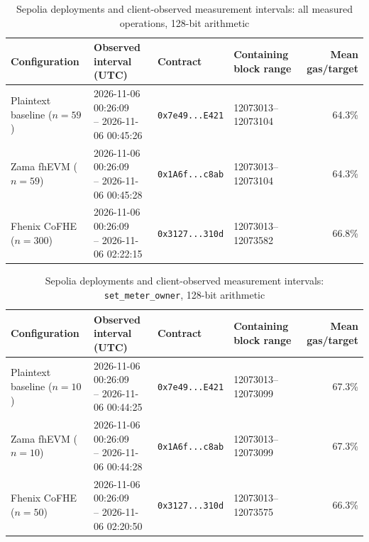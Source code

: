 \begin{table}[!t]
\caption{Sepolia deployments and client-observed measurement intervals: all measured operations, 128-bit arithmetic}
\label{tab:sepolia-client-intervals-classic-euint128-overall}
\centering
\footnotesize
\setlength{\tabcolsep}{4pt}
\begin{tabular}{|l|l|l|l|r|}
\hline
\textbf{Configuration} &
\textbf{Observed interval (UTC)} &
\textbf{Contract} &
\textbf{Containing block range} &
\textbf{Mean gas/target} \\
\hline
Plaintext baseline (\(n=59\)) &
\shortstack[l]{2026-11-06 00:26:09 \\ -- 2026-11-06 00:45:26} &
\texttt{0x7e49...E421} &
12073013--12073104 &
64.3\% \\
\hline
Zama fhEVM (\(n=59\)) &
\shortstack[l]{2026-11-06 00:26:09 \\ -- 2026-11-06 00:45:28} &
\texttt{0x1A6f...c8ab} &
12073013--12073104 &
64.3\% \\
\hline
Fhenix CoFHE (\(n=300\)) &
\shortstack[l]{2026-11-06 00:26:09 \\ -- 2026-11-06 02:22:15} &
\texttt{0x3127...310d} &
12073013--12073582 &
66.8\% \\
\hline
\end{tabular}
\end{table}

\begin{table}[!t]
\caption{Sepolia deployments and client-observed measurement intervals: \texttt{set\_meter\_owner}, 128-bit arithmetic}
\label{tab:sepolia-client-intervals-classic-euint128-set-meter-owner}
\centering
\footnotesize
\setlength{\tabcolsep}{4pt}
\begin{tabular}{|l|l|l|l|r|}
\hline
\textbf{Configuration} &
\textbf{Observed interval (UTC)} &
\textbf{Contract} &
\textbf{Containing block range} &
\textbf{Mean gas/target} \\
\hline
Plaintext baseline (\(n=10\)) &
\shortstack[l]{2026-11-06 00:26:09 \\ -- 2026-11-06 00:44:25} &
\texttt{0x7e49...E421} &
12073013--12073099 &
67.3\% \\
\hline
Zama fhEVM (\(n=10\)) &
\shortstack[l]{2026-11-06 00:26:09 \\ -- 2026-11-06 00:44:28} &
\texttt{0x1A6f...c8ab} &
12073013--12073099 &
67.3\% \\
\hline
Fhenix CoFHE (\(n=50\)) &
\shortstack[l]{2026-11-06 00:26:09 \\ -- 2026-11-06 02:20:50} &
\texttt{0x3127...310d} &
12073013--12073575 &
66.3\% \\
\hline
\end{tabular}
\end{table}

